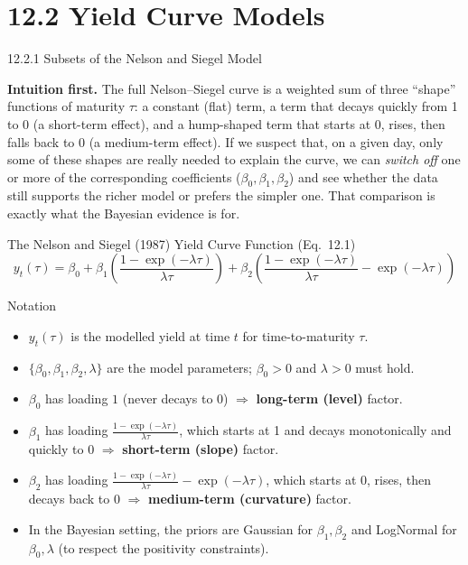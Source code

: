 \documentclass[aspectratio=169,10pt]{beamer}
\begin{document}
\section{12.2 Yield Curve Models}

\begin{frame}[allowframebreaks]{12.2.1 Subsets of the Nelson and Siegel Model}

\textbf{Intuition first.} The full Nelson--Siegel curve is a weighted sum of three ``shape'' functions of maturity $\tau$: a constant (flat) term, a term that decays quickly from 1 to 0 (a short-term effect), and a hump-shaped term that starts at 0, rises, then falls back to 0 (a medium-term effect). If we suspect that, on a given day, only some of these shapes are really needed to explain the curve, we can \emph{switch off} one or more of the corresponding coefficients ($\beta_0,\beta_1,\beta_2$) and see whether the data still supports the richer model or prefers the simpler one. That comparison is exactly what the Bayesian evidence is for.

\begin{block}{The Nelson and Siegel (1987) Yield Curve Function (Eq.~12.1)}
\[
  y_t(\tau) = \beta_0 + \beta_1\left(\frac{1-\exp(-\lambda\tau)}{\lambda\tau}\right)
  + \beta_2\left(\frac{1-\exp(-\lambda\tau)}{\lambda\tau} - \exp(-\lambda\tau)\right)
\]
\end{block}

\begin{block}{Notation}
\begin{itemize}
  \item $y_t(\tau)$ is the modelled yield at time $t$ for time-to-maturity $\tau$.
  \item $\{\beta_0,\beta_1,\beta_2,\lambda\}$ are the model parameters; $\beta_0>0$ and $\lambda>0$ must hold.
  \item $\beta_0$ has loading $1$ (never decays to 0) $\Rightarrow$ \textbf{long-term (level)} factor.
  \item $\beta_1$ has loading $\frac{1-\exp(-\lambda\tau)}{\lambda\tau}$, which starts at 1 and decays monotonically and quickly to 0 $\Rightarrow$ \textbf{short-term (slope)} factor.
  \item $\beta_2$ has loading $\frac{1-\exp(-\lambda\tau)}{\lambda\tau}-\exp(-\lambda\tau)$, which starts at 0, rises, then decays back to 0 $\Rightarrow$ \textbf{medium-term (curvature)} factor.
  \item In the Bayesian setting, the priors are Gaussian for $\beta_1,\beta_2$ and LogNormal for $\beta_0,\lambda$ (to respect the positivity constraints).
\end{itemize}
\end{block}


\end{frame}
\end{document}
